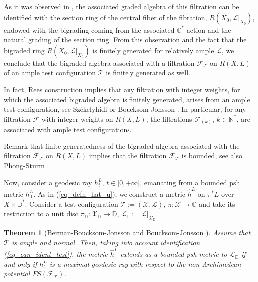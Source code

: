 \documentclass[12pt]{article}
\numberwithin{equation}{section}
\theoremstyle{theorem}
\newtheorem{thm}{Theorem}[section]
\theoremstyle{definition}
\theoremstyle{remark}
\newcommand{\comp}{\mathbb{C}}
\newcommand{\nat}{\mathbb{N}}
\begin{document}
	As it was observed in \cite[(9)]{NystOkounTest}, the associated graded algebra of this filtration can be identified with the section ring of the central fiber of the fibration, $R(X_0, \mathcal{L}|_{X_0})$, endowed with the bigrading coming from the associated $\comp^*$-action and the natural grading of the section ring.
	From this observation and the fact that the bigraded ring $R(X_0, \mathcal{L}|_{X_0})$ is finitely generated for relatively ample $\mathcal{L}$, we conclude that the bigraded algebra associated with a filtration $\mathcal{F}_{\mathcal{T}}$ on $R(X, L)$ of an ample test configuration $\mathcal{T}$ is finitely generated as well.
	\par 
	In fact, Rees construction implies that any filtration with integer weights, for which the associated bigraded algebra is finitely generated, arises from an ample test configuration, see Sz{\'e}kelyhidi \cite[\S 3.1]{SzekeTestConf} or Boucksom-Jonsson \cite[\S A.2]{BouckJohn21}.
	In particular, for any filtration $\mathcal{F}$ with integer weights on $R(X, L)$, the filtrations $\mathcal{F}_{(k)}$, $k \in \nat^*$, are associated with ample test configurations.
	\par 
	Remark that finite generatedness of the bigraded algebra associated with the filtration $\mathcal{F}_{\mathcal{T}}$ on $R(X, L)$ implies that the filtration $\mathcal{F}_{\mathcal{T}}$ is bounded, see also Phong-Sturm \cite[Lemma 4]{PhongSturmTestGeodK}.
	\par 
	Now, consider a geodesic ray $h^L_t$, $t \in [0, +\infty[$, emanating from a bounded psh metric $h^L_0$.
	As in (\ref{eq_defn_hat_u}), we construct a metric $\hat{h}^L$ on $\pi^* L$ over $X \times \mathbb{D}^*$.
	Consider a test configuration $\mathcal{T} := (\mathcal{X}, \mathcal{L})$, $\pi : \mathcal{X} \to \comp$ and take its restriction to a unit disc $\pi_{\mathbb{D}} : \mathcal{X}_{\mathbb{D}} \to \mathbb{D}$, $\mathcal{L}_{\mathbb{D}} := \mathcal{L}|_{\mathcal{X}_{\mathbb{D}}}$.
	\begin{thm}[{Berman-Boucksom-Jonsson \cite[Lemmas 4.4, 5.3 and Corollary 6.7]{BerBouckJonYTD} and Boucksom-Jonsson \cite[Lemma A.12]{BouckJohn21}}]\label{thm_bbj_compat}
		Assume that $\mathcal{T}$ is ample and normal.
		Then, taking into account identification (\ref{eq_can_ident_test}), the metric $\hat{h}^L$ extends as a bounded psh metric to $\mathcal{L}_{\mathbb{D}}$ if and only if $h^L_t$ is a maximal geodesic ray with respect to the non-Archimedean potential $FS(\mathcal{F}_{\mathcal{T}})$.
	\end{thm}
\end{document}
